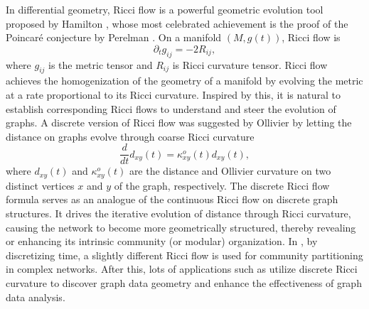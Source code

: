 \documentclass{article}
\begin{document}
In differential geometry, Ricci flow is a powerful geometric evolution tool proposed by Hamilton \cite{H82}, whose most celebrated achievement is the proof of the Poincaré conjecture by Perelman \cite{P02}. On  a manifold $(M,g(t))$, Ricci flow is
\[\partial_tg_{ij} = -2 R_{ij},\]
where \( g_{ij} \) is the metric tensor and $R_{ij}$ is Ricci curvature tensor. Ricci flow achieves the homogenization of the geometry of a manifold by evolving the metric at a rate proportional to its Ricci curvature. Inspired by this, it is natural to establish corresponding Ricci flows to understand and steer the evolution of graphs. A discrete version of Ricci flow was suggested by Ollivier \cite{Ollivier}  by letting the distance on graphs evolve through coarse
Ricci curvature
\begin{equation}\label{eq:orig}
    \frac{d}{dt}d_{xy}(t)=\kappa^o_{xy}(t)d_{xy}(t),
\end{equation}
where $d_{xy}(t)$  and $\kappa^o_{xy}(t)$ are the distance and Ollivier curvature on two distinct vertices $x$ and $y$ of the graph, respectively.  The discrete Ricci flow formula serves as an analogue of the continuous Ricci flow on discrete graph structures. It drives the iterative evolution of distance through Ricci curvature, causing the network to become more geometrically structured, thereby revealing or enhancing its intrinsic community (or modular) organization.
In \cite{NLLG19}, by discretizing time, a slightly different Ricci flow 
is used for community partitioning in complex networks.
After this, lots of applications such as \cite{Farooq2017Network, Lai2022Normalized, Lai2023Deeper,Yadav2023Discrete, Zheng2026RicciGraphDTA} utilize discrete Ricci curvature to discover graph data geometry and enhance the effectiveness of graph data analysis. %
\end{document}
